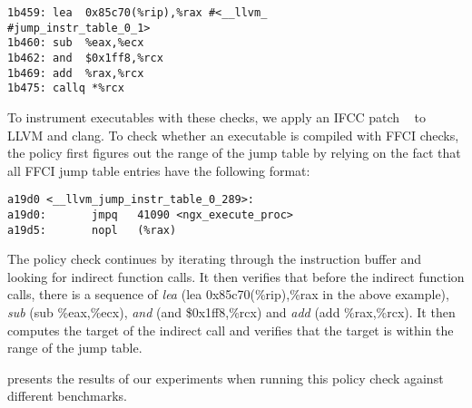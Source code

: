 \begin{lstlisting}
1b459: lea  0x85c70(%rip),%rax #<__llvm_
#jump_instr_table_0_1>
1b460: sub  %eax,%ecx
1b462: and  $0x1ff8,%rcx
1b469: add  %rax,%rcx
1b475: callq *%rcx
\end{lstlisting}

To instrument executables with these checks, we apply an IFCC patch ~\cite{https://reviews.llvm.org/D4167} 
to LLVM and clang. To check whether an executable is compiled with FFCI checks, the policy first figures 
out the range of the jump table by relying on the fact that all FFCI jump table entries have the following 
format:
\begin{lstlisting}
a19d0 <__llvm_jump_instr_table_0_289>:
a19d0:       jmpq   41090 <ngx_execute_proc>
a19d5:       nopl   (%rax)
\end{lstlisting}

The policy check continues by iterating through the instruction buffer and looking for
indirect function calls. It then verifies that before the indirect function calls, there is a sequence of \textit{lea} (lea 0x85c70(\%rip),\%rax in the above example), \textit{sub} (sub \%eax,\%ecx), \textit{and} 
(and    \$0x1ff8,\%rcx) and \textit{add} (add \%rax,\%rcx). It then computes the target of the indirect call 
and verifies that the target is within the range of the jump table.

 presents the results of our experiments when running this policy check against different benchmarks.
